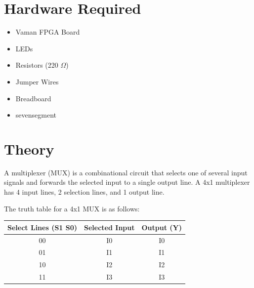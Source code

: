 \documentclass[a4paper,12pt]{article}
\begin{document}
\section*{Hardware Required}
\begin{itemize}
    \item Vaman FPGA Board
    \item LEDs
    \item Resistors (220 $\Omega$)
    \item Jumper Wires
    \item Breadboard
    \item sevensegment 
\end{itemize}

\section*{Theory}
A multiplexer (MUX) is a combinational circuit that selects one of several input signals and forwards the selected input to a single output line.  
A 4x1 multiplexer has 4 input lines, 2 selection lines, and 1 output line.

The truth table for a 4x1 MUX is as follows:

\begin{center}
\begin{tabular}{|c|c|c|}
\hline
Select Lines (S1 S0) & Selected Input & Output (Y) \\
\hline
00 & I0 & I0 \\
01 & I1 & I1 \\
10 & I2 & I2 \\
11 & I3 & I3 \\
\hline
\end{tabular}
\end{center}
\end{document}
